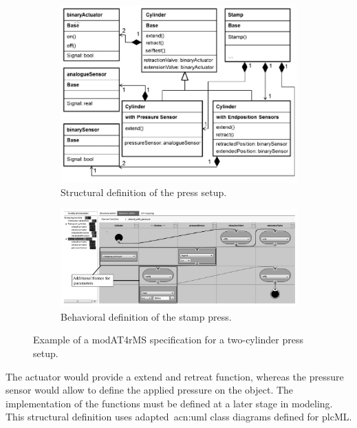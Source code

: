 \begin{figure}[h]
	\begin{subfigure}{\textwidth}
		\includegraphics[width=\textwidth]{./Figures/modAT4rMS_struct.png}
		\caption{Structural definition of the press setup.}
		\label{fig:modAT_struct}
	\end{subfigure}
	\begin{subfigure}{\textwidth}
		\includegraphics[width=\textwidth]{./Figures/modAT4rMS_beh.png}
		\caption{Behavioral definition of the stamp press.}
		\label{fig:modAT_beh}
	\end{subfigure}
	\caption[Example of a modAT4rMS specification for a two-cylinder press setup.]{Example of a modAT4rMS specification for a two-cylinder press setup.~\cite{Obermeier:2015aa}}
	\label{fig:modAT}
\end{figure}
The actuator would provide a extend and retreat function, whereas the pressure sensor would allow to define the applied pressure on the object.
The implementation of the functions must be defined at a later stage in modeling.
This structural definition uses adapted~\acrshort{acn:uml} class diagrams defined for plcML.
